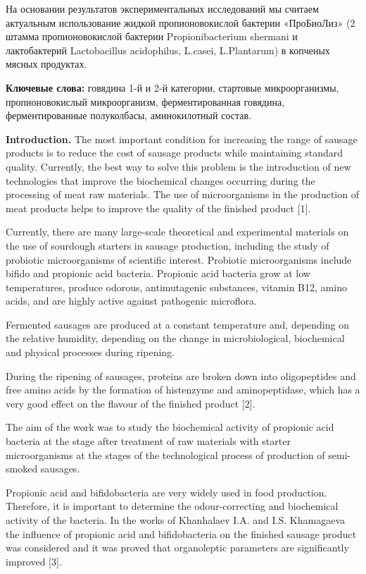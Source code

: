 На основании результатов экспериментальных исследований мы считаем
актуальным использование жидкой пропионовокислой бактерии «ПроБиоЛиз» (2
штамма пропионовокислой бактерии Propionibacterium shermani и
лактобактерий Lactobacillus acidophilus, L.casei, L.Plantarum) в
копченых мясных продуктах.

{\bfseries Ключевые слова:} говядина 1-й и 2-й категории, стартовые
микроорганизмы, пропионовокислый микроорганизм, ферментированная
говядина, ферментированные полуколбасы, аминокилотный состав.

\begin{multicols}{2}
{\bfseries Introduction.} The most important condition for increasing the
range of sausage products is to reduce the cost of sausage products
while maintaining standard quality. Currently, the best way to solve
this problem is the introduction of new technologies that improve the
biochemical changes occurring during the processing of meat raw
materials. The use of microorganisms in the production of meat products
helps to improve the quality of the finished product {[}1{]}.

Currently, there are many large-scale theoretical and experimental
materials on the use of sourdough starters in sausage production,
including the study of probiotic microorganisms of scientific interest.
Probiotic microorganisms include bifido and propionic acid bacteria.
Propionic acid bacteria grow at low temperatures, produce odorous,
antimutagenic substances, vitamin B12, amino acids, and are highly
active against pathogenic microflora.

Fermented sausages are produced at a constant temperature and, depending
on the relative humidity, depending on the change in microbiological,
biochemical and physical processes during ripening.

During the ripening of sausages, proteins are broken down into
oligopeptides and free amino acids by the formation of histenzyme and
aminopeptidase, which has a very good effect on the flavour of the
finished product {[}2{]}.

The aim of the work was to study the biochemical activity of propionic
acid bacteria at the stage after treatment of raw materials with starter
microorganisms at the stages of the technological process of production
of semi-smoked sausages.

Propionic acid and bifidobacteria are very widely used in food
production. Therefore, it is important to determine the odour-correcting
and biochemical activity of the bacteria. In the works of Khanhalaev
I.A. and I.S. Khamagaeva the influence of propionic acid and
bifidobacteria on the finished sausage product was considered and it was
proved that organoleptic parameters are significantly improved {[}3{]}.


\end{multicols}
